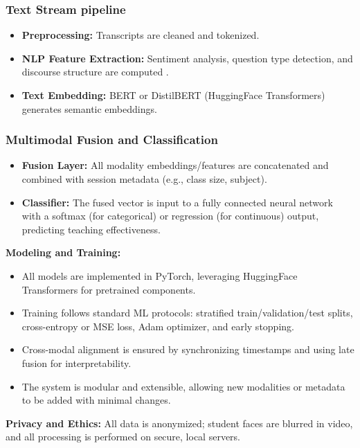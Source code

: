 \subsubsection{Text Stream pipeline}  
\begin{itemize}
    \item \textbf{Preprocessing:} Transcripts are cleaned and tokenized.
    \item \textbf{NLP Feature Extraction:} Sentiment analysis, question type detection, and discourse structure are computed \cite{sinclair1975discourse}.
    \item \textbf{Text Embedding:} BERT or DistilBERT (HuggingFace Transformers) generates semantic embeddings.
\end{itemize}

\subsubsection{Multimodal Fusion and Classification}  
\begin{itemize}
    \item \textbf{Fusion Layer:} All modality embeddings/features are concatenated and combined with session metadata (e.g., class size, subject).
    \item \textbf{Classifier:} The fused vector is input to a fully connected neural network with a softmax (for categorical) or regression (for continuous) output, predicting teaching effectiveness.
\end{itemize}

\textbf{Modeling and Training:}  
\begin{itemize}
    \item All models are implemented in PyTorch, leveraging HuggingFace Transformers for pretrained components.
    \item Training follows standard ML protocols: stratified train/validation/test splits, cross-entropy or MSE loss, Adam optimizer, and early stopping.
    \item Cross-modal alignment is ensured by synchronizing timestamps and using late fusion for interpretability.
    \item The system is modular and extensible, allowing new modalities or metadata to be added with minimal changes.
\end{itemize}

\textbf{Privacy and Ethics:}  
All data is anonymized; student faces are blurred in video, and all processing is performed on secure, local servers.

